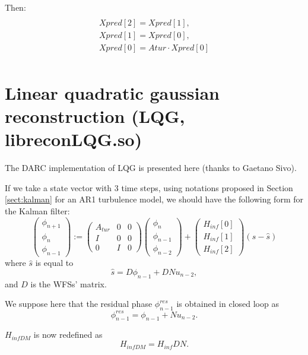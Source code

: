 \documentclass[a4,10pt]{article}
\begin{document}
Then: 
\begin{multline}\\
Xpred[2]=Xpred[1],\\
Xpred[1]=Xpred[0],\\
Xpred[0]=Atur \cdot Xpred[0]\\
\end{multline}



\section{Linear quadratic gaussian reconstruction (LQG, libreconLQG.so)}
\label{sect:lqg}
The DARC  implementation of LQG is presented here (thanks to Gaetano Sivo).

If we take a state vector with 3 time steps, using
notations proposed in Section \ref{sect:kalman} for an AR1 turbulence model, we should have the following form for the Kalman filter:
\begin{equation}
\begin{pmatrix}
\phi_{n+1} \\
\phi_n \\
\phi_{n-1} \end{pmatrix}
:=\begin{pmatrix}A_{tur} &0&0\\
I&0&0\\
0&I&0\end{pmatrix}\begin{pmatrix}
\phi_{n}\\
\phi_{n-1}\\
\phi_{n-2}\end{pmatrix}+\begin{pmatrix}H_{inf}[0]\\H_{inf}[1]\\H_{inf}[2]\end{pmatrix}(s-\hat{s})
\label{eq:Kalman1}
\end{equation}
where $\hat{s}$ is equal to
\begin{equation}
\hat{s}=D\phi_{n-1}+DNu_{n-2},
\label{eq:shat}
\end{equation}
and $D$ is the WFSs' matrix.

We suppose here that the residual phase $\phi^{res}_{n-1}$ is obtained in closed loop as
\begin{equation}
\phi^{res}_{n-1}=\phi_{n-1}+Nu_{n-2}.
\end{equation}

$H_{infDM}$ is now redefined as
\begin{equation}
H_{infDM}=H_{inf}DN.
\end{equation}
\end{document}
